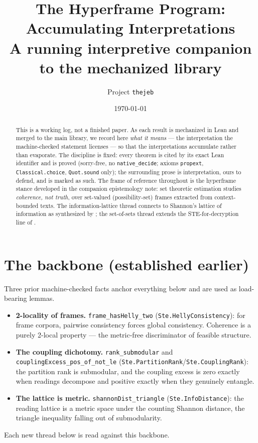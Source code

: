\documentclass[11pt]{article}
\title{The Hyperframe Program: Accumulating Interpretations\\
\large A running interpretive companion to the mechanized library}
\author{Project \texttt{thejeb}}
\date{\today}
\newcommand{\code}[1]{\texttt{#1}}
\begin{document}
\maketitle

\begin{abstract}
This is a working log, not a finished paper.  As each result is
mechanized in Lean and merged to the main library, we record here
\emph{what it means} --- the interpretation the machine-checked
statement licenses --- so that the interpretations accumulate rather
than evaporate.  The discipline is fixed: every theorem is cited by its
exact Lean identifier and is proved (sorry-free, no \code{native\_decide};
axioms \code{propext}, \code{Classical.choice}, \code{Quot.sound} only);
the surrounding prose is interpretation, ours to defend, and is marked as
such.  The frame of reference throughout is the hyperframe stance
developed in the companion epistemology note: set theoretic estimation
\citep{combettes1993} studies \emph{coherence, not truth}, over
set-valued (possibility-set) frames extracted from context-bounded
texts.  The information-lattice thread connects to Shannon's lattice of
information as synthesized by \citet{delsol2024}; the set-of-sets thread
extends the STE-for-decryption line of \citet{carlson2012}.
\end{abstract}

\section{The backbone (established earlier)}
Three prior machine-checked facts anchor everything below and are used
as load-bearing lemmas.
\begin{itemize}
\item \textbf{2-locality of frames.} \code{frame\_hasHelly\_two}
  (\code{Ste.HellyConsistency}): for frame corpora, pairwise consistency
  forces global consistency.  Coherence is a purely 2-local property ---
  the metric-free discriminator of feasible structure.
\item \textbf{The coupling dichotomy.} \code{rank\_submodular} and
  \code{couplingExcess\_pos\_of\_not\_le}
  (\code{Ste.PartitionRank}/\code{Ste.CouplingRank}): the partition rank
  is submodular, and the coupling excess is zero exactly when readings
  decompose and positive exactly when they genuinely entangle.
\item \textbf{The lattice is metric.} \code{shannonDist\_triangle}
  (\code{Ste.InfoDistance}): the reading lattice is a metric space under
  the counting Shannon distance, the triangle inequality falling out of
  submodularity.
\end{itemize}
Each new thread below is read against this backbone.
\end{document}
